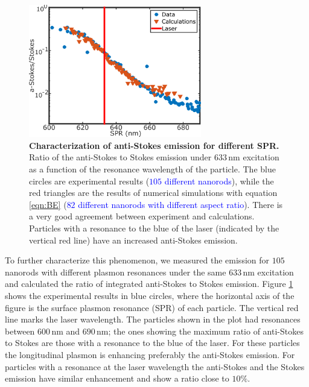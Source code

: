 \documentclass[journal=nalefd,manuscript=letter]{achemso}
\newcommand{\HI}[1]{\textcolor{blue}{#1}} %
\newcommand{\nm}{\ensuremath{\,\textrm{nm}}}
\begin{document}
\begin{figure}[tp] \centering
\includegraphics[width=75.5mm]{Figures/02_AS_vs_S_SPR/02_AS_vs_S_SPR.png}
\caption{\textbf{Characterization of anti-Stokes emission for different SPR.} 
Ratio of the anti-Stokes to Stokes emission under $633\nm$ excitation
as a function of the resonance wavelength of the particle.
The blue circles are experimental results (\HI{$105$ different nanorods}), while the red triangles are the
results of numerical simulations with equation \ref{eqn:BE} (\HI{$82$ different nanorods with different 
aspect ratio}). 
There is a very good agreement between experiment and calculations. Particles with a resonance
to the blue of the laser (indicated by the vertical red line) have an increased anti-Stokes
emission.}
	\label{fig:ASS-ratio}
\end{figure}

To further characterize this phenomenon, we measured the emission for $105$
nanorods with different plasmon resonances under the same $633\nm$ excitation
and calculated the ratio of integrated anti-Stokes to Stokes emission.
Figure \ref{fig:ASS-ratio} shows the experimental results in blue circles, where
the horizontal axis of the figure is the surface plasmon resonance (SPR) of each
particle. The vertical red line marks the laser wavelength. The particles shown
in the plot had resonances between $600\nm$ and $690\nm$; the ones showing the
maximum ratio of anti-Stokes to Stokes are those with a resonance to the blue of
the laser. For these particles the longitudinal plasmon is enhancing preferably the
anti-Stokes emission. For particles with a resonance at the laser wavelength the
anti-Stokes and the Stokes emission have similar enhancement and show a ratio
close to $10\%$.
\end{document}
